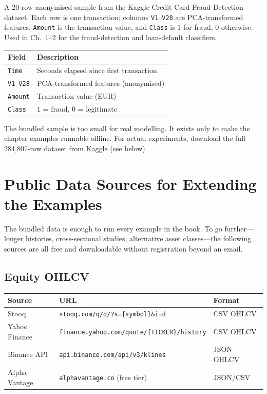 A 20-row anonymised sample from the Kaggle Credit Card Fraud Detection
dataset. Each row is one transaction; columns \texttt{V1}--\texttt{V28}
are PCA-transformed features, \texttt{Amount} is the transaction value,
and \texttt{Class} is $1$ for fraud, $0$ otherwise. Used in Ch.~1--2
for the fraud-detection and loan-default classifiers.

\begin{center}
\begin{tabular}{ll}
\toprule
\textbf{Field} & \textbf{Description} \\
\midrule
\texttt{Time} & Seconds elapsed since first transaction \\
\texttt{V1}--\texttt{V28} & PCA-transformed features (anonymised) \\
\texttt{Amount} & Transaction value (EUR) \\
\texttt{Class} & $1$ = fraud, $0$ = legitimate \\
\bottomrule
\end{tabular}
\end{center}

\begin{warning}
The bundled sample is too small for real modelling. It exists only to
make the chapter examples runnable offline. For actual experiments,
download the full 284{,}807-row dataset from Kaggle (see below).
\end{warning}

\section{Public Data Sources for Extending the Examples}

The bundled data is enough to run every example in the book. To go
further---longer histories, cross-sectional studies, alternative
asset classes---the following sources are all free and downloadable
without registration beyond an email.

\subsection{Equity OHLCV}

\begin{center}
\begin{tabular}{lll}
\toprule
\textbf{Source} & \textbf{URL} & \textbf{Format} \\
\midrule
Stooq & \texttt{stooq.com/q/d/?s=\{symbol\}\&i=d} & CSV OHLCV \\
Yahoo Finance & \texttt{finance.yahoo.com/quote/\{TICKER\}/history} & CSV OHLCV \\
Binance API & \texttt{api.binance.com/api/v3/klines} & JSON OHLCV \\
Alpha Vantage & \texttt{alphavantage.co} (free tier) & JSON/CSV \\
\bottomrule
\end{tabular}
\end{center}

